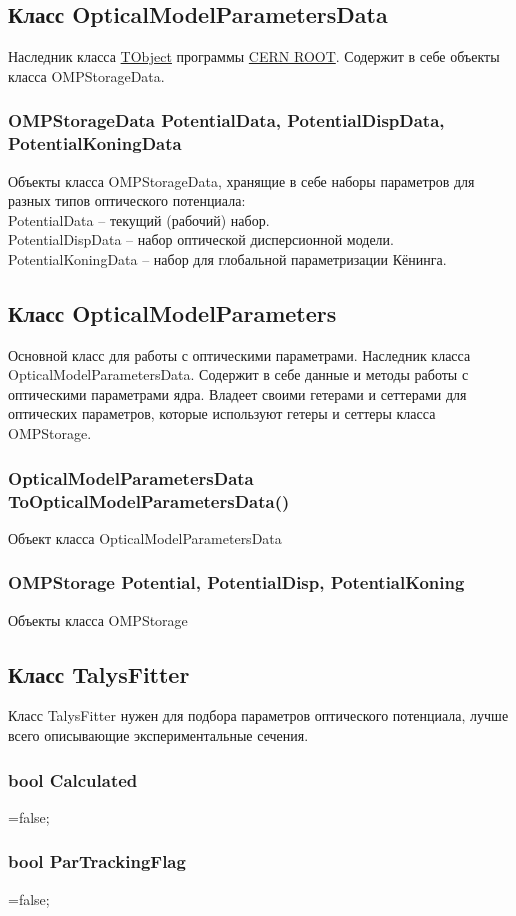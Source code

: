 \documentclass[a4paper,12pt]{extarticle}
\begin{document}
\subsection{Класс OpticalModelParametersData}
Наследник класса \href{https://root.cern/doc/master/classTObject.html}{TObject} программы \href{https://root.cern}{CERN ROOT}. Содержит в себе объекты класса OMPStorageData.
\subsubsection{OMPStorageData PotentialData, PotentialDispData, PotentialKoningData}
Объекты класса OMPStorageData, хранящие в себе наборы параметров для разных типов оптического потенциала:\\
PotentialData -- текущий (рабочий) набор.\\
PotentialDispData -- набор оптической дисперсионной модели.\\
PotentialKoningData -- набор для глобальной параметризации Кёнинга.
\subsection{Класс OpticalModelParameters}
Основной класс для работы с оптическими параметрами. Наследник класса OpticalModelParametersData. Содержит в себе данные и методы работы с оптическими параметрами ядра. Владеет своими гетерами и сеттерами для оптических параметров, которые используют гетеры и сеттеры класса OMPStorage.
\subsubsection{OpticalModelParametersData ToOpticalModelParametersData()}
Объект класса OpticalModelParametersData
\subsubsection{OMPStorage Potential, PotentialDisp, PotentialKoning}
Объекты класса OMPStorage
\subsection{Класс TalysFitter}
Класс TalysFitter нужен для подбора параметров оптического потенциала, лучше всего описывающие экспериментальные сечения. 
\subsubsection{bool Calculated}
=false;
\subsubsection{bool ParTrackingFlag}
=false;
\end{document}

